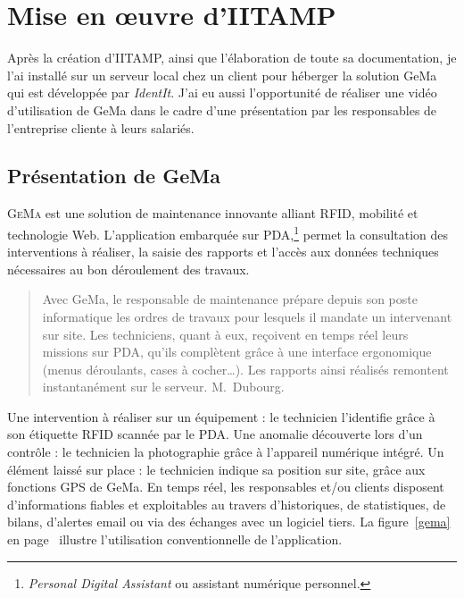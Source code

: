 \chapter{Mise en \oe{}uvre d'IITAMP} %
\label{cha:Mise en oeuvre d'IITAMP}

\begin{it}

Après la création d'IITAMP, ainsi que l'élaboration de toute sa
documentation, je l'ai installé sur un serveur local chez un client pour
héberger la solution GeMa qui est développée par \emph{IdentIt}. J'ai eu
aussi l'opportunité de réaliser une vidéo d'utilisation de GeMa dans le
cadre d'une présentation par les responsables de l'entreprise cliente à
leurs salariés.

\end{it}

\section{Présentation de GeMa} %
\label{sec:Présentation de GeMa}

\lettrine{G}{eMa} est une solution de maintenance innovante alliant
RFID, mobilité et technologie Web. L'application embarquée sur
PDA,\footnote{\emph{Personal Digital Assistant} ou assistant numérique
personnel.} permet la consultation des interventions à réaliser, la
saisie des rapports et l'accès aux données techniques nécessaires au bon
déroulement des travaux.

\begin{quotation}

\og{}Avec GeMa, le responsable de maintenance prépare depuis son poste
informatique les ordres de travaux pour lesquels il mandate un
intervenant sur site. Les techniciens, quant à eux, reçoivent en temps
réel leurs missions sur PDA, qu'ils complètent grâce à une interface
ergonomique (menus déroulants, cases à cocher\dots). Les rapports ainsi
réalisés remontent instantanément sur le serveur. \fg{} M.~Dubourg.

\end{quotation}

Une intervention à réaliser sur un équipement : le technicien
l'identifie grâce à son étiquette RFID scannée par le PDA. Une anomalie
découverte lors d'un contrôle : le technicien la photographie grâce à
l'appareil numérique intégré. Un élément laissé sur place : le
technicien indique sa position sur site, grâce aux fonctions GPS de
GeMa. En temps réel, les responsables et/ou clients disposent
d'informations fiables et exploitables au travers d'historiques, de
statistiques, de bilans, d'alertes email ou via des échanges avec un
logiciel tiers. La figure~\ref{gema} en page~\pageref{gema} illustre
l'utilisation conventionnelle de l'application.

